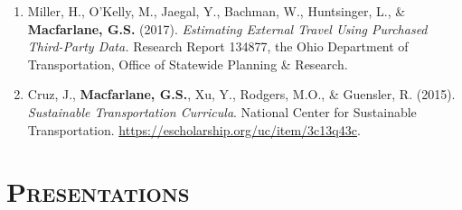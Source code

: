 \documentclass[margin,line]{res}
\newif\ifdetail
\newcounter{enuminitialize}
\newenvironment{myenum}[1][]
{%
 \setcounter{enuminitialize}{#1}
 \addtocounter{enuminitialize}{2}
 \begin{enumerate}[left= 4pt, itemsep=8pt, start=\value{enuminitialize}, label=\arabic*\addtocounter{enumi}{-2}]
}
{%
 \end{enumerate}
}
\newcommand{\secfont}{\scshape }
\begin{document}
\begin{resume}
\begin{myenum}[13]
\item Miller, H., O'Kelly, M., Jaegal, Y., Bachman, W., Huntsinger, L., \&
  \textbf{Macfarlane, G.S.} (2017). \textit{Estimating External Travel Using
  Purchased Third-Party Data.} Research Report 134877, the Ohio Department of
  Transportation, Office of Statewide Planning \& Research. \ifdetail Citations: 1 \fi

\item Cruz, J., \textbf{Macfarlane, G.S.}, Xu, Y., Rodgers, M.O., \& Guensler,
  R. (2015). \textit{Sustainable Transportation Curricula}. National Center for
  Sustainable Transportation. \url{https://escholarship.org/uc/item/3c13q43c}.
\end{myenum}

\noindent\makebox[\linewidth]{\rule{\linewidth}{0.4pt}}
\section{\secfont Presentations}
\ifdetail This includes invited presentations to academic and non-academic audiences, as
well as presentations resulting from abstract-only submission. Includes both
lectern sessions and posters. Item 1 came from my undergraduate honors thesis, items 2 through 4 from doctoral research,
items 5 through 10 from my work as a consultant, and items 11 through the present represent work
completed during my time at BYU.\fi

\vspace{0.3cm}




\end{resume}
\end{document}
